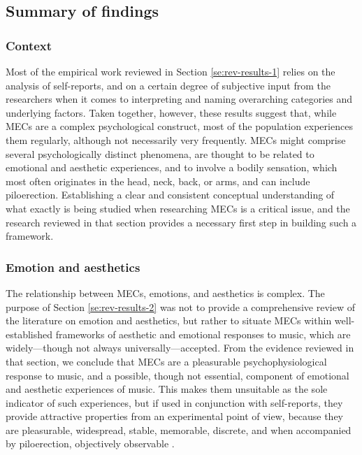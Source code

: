 \subsection{Summary of findings}

\subsubsection{Context}

Most of the empirical work reviewed in Section \ref{se:rev-results-1} relies on the analysis of self-reports, and on a certain degree of subjective input from the researchers when it comes to interpreting and naming overarching categories and underlying factors. Taken together, however, these results suggest that, while MECs are a complex psychological construct, most of the population experiences them regularly, although not necessarily very frequently. MECs might comprise several psychologically distinct phenomena, are thought to be related to emotional and aesthetic experiences, and to involve a bodily sensation, which most often originates in the head, neck, back, or arms, and can include piloerection. Establishing a clear and consistent conceptual understanding of what exactly is being studied when researching MECs is a critical issue, and the research reviewed in that section provides a necessary first step in building such a framework.

\subsubsection{Emotion and aesthetics}

The relationship between MECs, emotions, and aesthetics is complex. The purpose of Section \ref{se:rev-results-2} was not to provide a comprehensive review of the literature on emotion and aesthetics, but rather to situate MECs within well-established frameworks of aesthetic and emotional responses to music, which are widely---though not always universally---accepted. From the evidence reviewed in that section, we conclude that MECs are a pleasurable psychophysiological response to music, and a possible, though not essential, component of emotional and aesthetic experiences of music. This makes them unsuitable as the sole indicator of such experiences, but if used in conjunction with self-reports, they provide attractive properties from an experimental point of view, because they are pleasurable, widespread, stable, memorable, discrete, and when accompanied by piloerection, objectively observable \parencite{brattico2013a, brattico2019b, grewe2009b, mcdermott2012, sloboda1991, stark2018, vuust2010, zatorre2003}.

